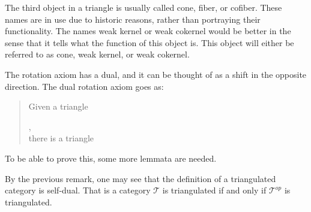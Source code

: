     \begin{remark}
        The third object in a triangle is usually called cone, fiber, or cofiber. These names are in use due to historic reasons, rather than portraying their functionality. The names weak kernel or weak cokernel would be better in the sense that it tells what the function of this object is. This object will either be referred to as cone, weak kernel, or weak cokernel.
    \end{remark}
    \begin{remark}
        The rotation axiom has a dual, and it can be thought of as a shift in the opposite direction. The dual rotation axiom goes as:
        
        \begin{quote}
            Given a triangle ,\\
            there is a triangle 
        \end{quote} %
        
        To be able to prove this, some more lemmata are needed.
    \end{remark}

    \begin{remark}
        By the previous remark, one may see that the definition of a triangulated category is self-dual. That is a category $\mathcal{T}$ is triangulated if and only if $\mathcal{T}^{op}$ is triangulated.
    \end{remark}

